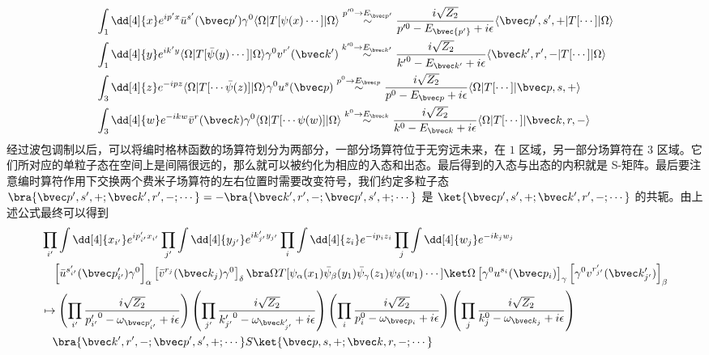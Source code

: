\begin{equation}
\begin{aligned}
&\int_{ 1} \dd[4]{x} e^{ip'x} \bar{u}^{s'}(\bvec p')\gamma^0\langle \Omega|T[\psi(x)\cdots]|\Omega\rangle
\stackrel{p'^0\rightarrow E_{\bvec p'}}{\sim}
\frac{i\sqrt{Z_2}}{p'^0-E_{\bvec {p'}}+i\epsilon} \langle \bvec p',s',+| T[\cdots]|\Omega\rangle\\
&
\int_{ 1} \dd[4]{y} e^{ik'y} \langle \Omega|T[\bar{\psi}(y)\cdots]|\Omega\rangle \gamma^0 v^{r'}(\bvec k')
\stackrel{k'^0\rightarrow E_{\bvec k'}}{\sim}
\frac{i\sqrt{Z_2}}{{k'}^0-E_{\bvec k'}+i\epsilon} \langle \bvec k',r',-| T[\cdots]|\Omega\rangle\\
&
\int_{ 3} \dd[4]{z} e^{-ipz}
\langle \Omega|T[\cdots\bar{\psi}(z)]| \Omega\rangle\gamma^0  u^{s}(\bvec p)
\stackrel{p^0\rightarrow E_{\bvec p}}{\sim}
\frac{i\sqrt{Z_2}}{p^0-E_{\bvec p}+i\epsilon} \langle \Omega| T[\cdots]|\bvec p,s,+\rangle\\
&
\int_{ 3} \dd[4]{w} e^{-ikw}
\bar{v}^{r}(\bvec k)\gamma^0\langle \Omega|T[\cdots\psi(w)]| \Omega\rangle  
\stackrel{k^0\rightarrow E_{\bvec k}}{\sim}
\frac{i\sqrt{Z_2}}{k^0-E_{\bvec k}+i\epsilon} \langle \Omega| T[\cdots]|\bvec k,r,-\rangle
\end{aligned}
\end{equation}
经过波包调制以后，可以将编时格林函数的场算符划分为两部分，一部分场算符位于无穷远未来，在 $ 1$ 区域，另一部分场算符在 $ 3$ 区域。它们所对应的单粒子态在空间上是间隔很远的，那么就可以被约化为相应的入态和出态。最后得到的入态与出态的内积就是 S-矩阵。最后要注意编时算符作用下交换两个费米子场算符的左右位置时需要改变符号，我们约定多粒子态 $\bra{\bvec p',s',+;\bvec k',r',-;\cdots}=-\bra{\bvec k',r',-;\bvec p',s',+;\cdots}$ 是 $\ket{\bvec p',s',+;\bvec k',r',-;\cdots}$ 的共轭。由上述公式最终可以得到
\begin{equation}
\begin{aligned}
&
\prod_{i'}\int \dd[4]{x_{i'}} e^{ip'_{i'}x_{i'}}
\prod_{j'}\int \dd[4]{y_{j'}} e^{ik'_{j'}y_{j'}}
\prod_{i}\int \dd[4]{z_{i}} e^{-ip_{i}z_{i}}
\prod_{j}\int \dd[4]{w_{j}} e^{-ik_{j}w_{j}}
\\
&
\quad \left[\bar u^{s'_{i'}}(\bvec p'_{i'})\gamma^0\right]_{\alpha} 
\left[{\bar v}^{r_j}(\bvec k_{j})\gamma^0\right]_{\delta}
\bra\Omega T[\psi_\alpha(x_1)\bar\psi_\beta(y_1)\bar\psi_\gamma(z_1)\psi_\delta(w_1)\cdots]\ket \Omega 
\left[\gamma^0 u^{s_i}(\bvec p_{i})\right]_{\gamma} \left[\gamma^0 v^{r'_{j'}}(\bvec k'_{j'})\right]_{\beta}
\\
&
\mapsto 
\left(\prod_{i'}\frac{i\sqrt{Z_2}} {{p'_{i'}}^0-\omega_{\bvec p'_{i'}}+i\epsilon}\right)
\left(\prod_{j'}\frac{i\sqrt{Z_2}}{{k'_{j'}}^0-\omega_{\bvec k'_{j'}}+i\epsilon}\right)
\left(\prod_{i}\frac{i\sqrt{Z_2}}{p_i^0-\omega_{\bvec p_i}+i\epsilon}\right)
\left(\prod_{j}\frac{i\sqrt{Z_2}}{k_j^0-\omega_{\bvec k_j}+i\epsilon}\right)
\\
&
\quad \bra{\bvec k',r',-;\bvec p',s',+;\cdots} S \ket{\bvec p,s,+;\bvec k,r,-;\cdots}
\end{aligned}
\end{equation}
